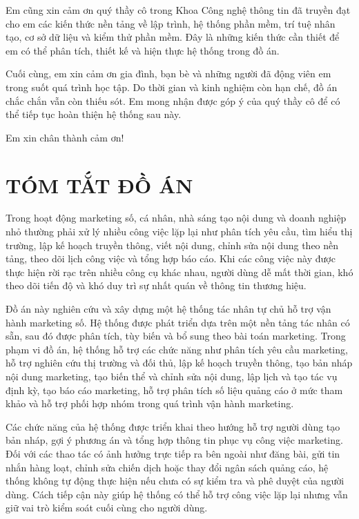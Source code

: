 \documentclass[a4paper]{article}
\begin{document}
Em cũng xin cảm ơn quý thầy cô trong Khoa Công nghệ thông tin đã truyền đạt cho em các kiến thức nền tảng về lập trình, hệ thống phần mềm, trí tuệ nhân tạo, cơ sở dữ liệu và kiểm thử phần mềm. Đây là những kiến thức cần thiết để em có thể phân tích, thiết kế và hiện thực hệ thống trong đồ án.

Cuối cùng, em xin cảm ơn gia đình, bạn bè và những người đã động viên em trong suốt quá trình học tập. Do thời gian và kinh nghiệm còn hạn chế, đồ án chắc chắn vẫn còn thiếu sót. Em mong nhận được góp ý của quý thầy cô để có thể tiếp tục hoàn thiện hệ thống sau này.

Em xin chân thành cảm ơn!

\clearpage
\section*{TÓM TẮT ĐỒ ÁN}
{}

Trong hoạt động marketing số, cá nhân, nhà sáng tạo nội dung và doanh nghiệp nhỏ thường phải xử lý nhiều công việc lặp lại như phân tích yêu cầu, tìm hiểu thị trường, lập kế hoạch truyền thông, viết nội dung, chỉnh sửa nội dung theo nền tảng, theo dõi lịch công việc và tổng hợp báo cáo. Khi các công việc này được thực hiện rời rạc trên nhiều công cụ khác nhau, người dùng dễ mất thời gian, khó theo dõi tiến độ và khó duy trì sự nhất quán về thông tin thương hiệu.

Đồ án này nghiên cứu và xây dựng một hệ thống tác nhân tự chủ hỗ trợ vận hành marketing số. Hệ thống được phát triển dựa trên một nền tảng tác nhân có sẵn, sau đó được phân tích, tùy biến và bổ sung theo bài toán marketing. Trong phạm vi đồ án, hệ thống hỗ trợ các chức năng như phân tích yêu cầu marketing, hỗ trợ nghiên cứu thị trường và đối thủ, lập kế hoạch truyền thông, tạo bản nháp nội dung marketing, tạo biến thể và chỉnh sửa nội dung, lập lịch và tạo tác vụ định kỳ, tạo báo cáo marketing, hỗ trợ phân tích số liệu quảng cáo ở mức tham khảo và hỗ trợ phối hợp nhóm trong quá trình vận hành marketing.

Các chức năng của hệ thống được triển khai theo hướng hỗ trợ người dùng tạo bản nháp, gợi ý phương án và tổng hợp thông tin phục vụ công việc marketing. Đối với các thao tác có ảnh hưởng trực tiếp ra bên ngoài như đăng bài, gửi tin nhắn hàng loạt, chỉnh sửa chiến dịch hoặc thay đổi ngân sách quảng cáo, hệ thống không tự động thực hiện nếu chưa có sự kiểm tra và phê duyệt của người dùng. Cách tiếp cận này giúp hệ thống có thể hỗ trợ công việc lặp lại nhưng vẫn giữ vai trò kiểm soát cuối cùng cho người dùng.
\end{document}
